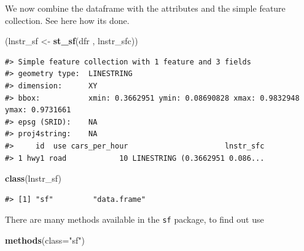 \documentclass[]{book}
\newenvironment{Shaded}{\begin{snugshade}}{\end{snugshade}}
\newcommand{\KeywordTok}[1]{\textcolor[rgb]{0.13,0.29,0.53}{\textbf{#1}}}
\newcommand{\DataTypeTok}[1]{\textcolor[rgb]{0.13,0.29,0.53}{#1}}
\newcommand{\StringTok}[1]{\textcolor[rgb]{0.31,0.60,0.02}{#1}}
\newcommand{\NormalTok}[1]{#1}
\theoremstyle{definition}
\theoremstyle{definition}
\theoremstyle{definition}
\theoremstyle{remark}
\begin{document}
We now combine the dataframe with the attributes and the simple feature
collection. See here how its done.

\begin{Shaded}
\begin{Highlighting}[]
\NormalTok{(lnstr_sf <-}\StringTok{ }\KeywordTok{st_sf}\NormalTok{(dfr , lnstr_sfc))}
\end{Highlighting}
\end{Shaded}

\begin{verbatim}
#> Simple feature collection with 1 feature and 3 fields
#> geometry type:  LINESTRING
#> dimension:      XY
#> bbox:           xmin: 0.3662951 ymin: 0.08690828 xmax: 0.9832948 ymax: 0.9731661
#> epsg (SRID):    NA
#> proj4string:    NA
#>     id  use cars_per_hour                      lnstr_sfc
#> 1 hwy1 road            10 LINESTRING (0.3662951 0.086...
\end{verbatim}

\begin{Shaded}
\begin{Highlighting}[]
\KeywordTok{class}\NormalTok{(lnstr_sf)}
\end{Highlighting}
\end{Shaded}

\begin{verbatim}
#> [1] "sf"         "data.frame"
\end{verbatim}

There are many methods available in the \texttt{sf} package, to find out
use

\begin{Shaded}
\begin{Highlighting}[]
\KeywordTok{methods}\NormalTok{(}\DataTypeTok{class=}\StringTok{"sf"}\NormalTok{)}
\end{Highlighting}
\end{Shaded}
\end{document}
